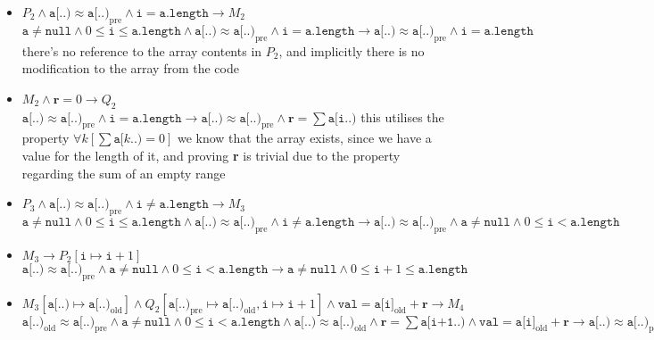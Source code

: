 \documentclass[a4paper, 12pt]{article}
\begin{document}
                \begin{itemize}
                    \item $P_2 \land \texttt{a[..)} \approx \texttt{a[..)}_\text{pre} \land \texttt{i} = \texttt{a.length} \rightarrow M_2$
                        \subitem $\texttt{a} \neq \texttt{null} \land 0 \leq \texttt{i} \leq \texttt{a.length} \land \texttt{a[..)} \approx \texttt{a[..)}_\text{pre} \land \texttt{i} = \texttt{a.length} \rightarrow \texttt{a[..)} \approx \texttt{a[..)}_\text{pre} \land \texttt{i} = \texttt{a.length}$
                        \subitem there's no reference to the array contents in $P_2$, and implicitly there is no modification to the array from the code
                    \item $M_2 \land \textbf{r} = 0 \rightarrow Q_2$
                        \subitem $\texttt{a[..)} \approx \texttt{a[..)}_\text{pre} \land \texttt{i} = \texttt{a.length} \rightarrow \texttt{a[..)} \approx \texttt{a[..)}_\text{pre} \land \textbf{r} = \sum \texttt{a[i..)}$
                        \subitem this utilises the property $\forall k [\sum \texttt{a[}k\texttt{..}\texttt{)} = 0]$
                        \subitem we know that the array exists, since we have a value for the length of it, and proving \textbf{r} is trivial due to the property regarding the sum of an empty range
                    \item $P_3 \land \texttt{a[..)} \approx \texttt{a[..)}_\text{pre} \land \texttt{i} \neq \texttt{a.length} \rightarrow M_3$
                        \subitem $\texttt{a} \neq \texttt{null} \land 0 \leq \texttt{i} \leq \texttt{a.length} \land \texttt{a[..)} \approx \texttt{a[..)}_\text{pre} \land \texttt{i} \neq \texttt{a.length} \rightarrow \texttt{a[..)} \approx \texttt{a[..)}_\text{pre} \land \texttt{a} \neq \texttt{null} \land 0 \leq \texttt{i} < \texttt{a.length}$
                    \item $M_3 \rightarrow P_2[\texttt{i} \mapsto \texttt{i} + 1]$
                        \subitem $\texttt{a[..)} \approx \texttt{a[..)}_\text{pre} \land \texttt{a} \neq \texttt{null} \land 0 \leq \texttt{i} < \texttt{a.length} \rightarrow \texttt{a} \neq \texttt{null} \land 0 \leq \texttt{i} + 1 \leq \texttt{a.length}$
                    \item $M_3[\texttt{a[..)} \mapsto \texttt{a[..)}_\text{old}] \land Q_2[\texttt{a[..)}_\text{pre} \mapsto \texttt{a[..)}_\text{old}, \texttt{i} \mapsto \texttt{i} + 1] \land \texttt{val} = \texttt{a[i]}_\text{old} + \textbf{r} \rightarrow M_4$
                        \subitem $\texttt{a[..)}_\text{old} \approx \texttt{a[..)}_\text{pre} \land \texttt{a} \neq \texttt{null} \land 0 \leq \texttt{i} < \texttt{a.length} \land \texttt{a[..)} \approx \texttt{a[..)}_\text{old} \land \textbf{r} = \sum \texttt{a[i+1..)} \land \texttt{val} = \texttt{a[i]}_\text{old} + \textbf{r} \rightarrow \texttt{a[..)} \approx \texttt{a[..)}_\text{pre} \land \texttt{val} = \sum \texttt{a[..)}$

\end{itemize}
\end{document}
